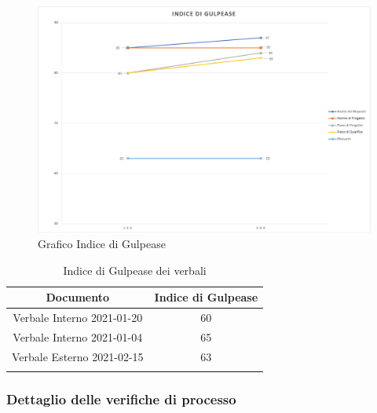 \begin{center}
    \begin{figure}[!htb]
        \centering
        \includegraphics[scale=0.60]{res/images/grafico_gulpease_rp.png}
        \caption{Grafico Indice di Gulpease}
    \end{figure}
    \begin{center}
        \begin{longtable}{|c|c|}
            \hline
            \rowcolor{lighter-grayer}
            \textbf{Documento}         & \textbf{Indice di Gulpease} \\
            \hline
            \endfirsthead

            \hline
            Verbale Interno 2021-01-20 & 60                          \\
            Verbale Interno 2021-01-04 & 65                          \\     
            Verbale Esterno 2021-02-15 & 63                          \\           
            \hline
            \rowcolor{white}
            \caption{Indice di Gulpease dei verbali}
        \end{longtable}
    \end{center}
\end{center}

\subsubsection{Dettaglio delle verifiche di processo}


